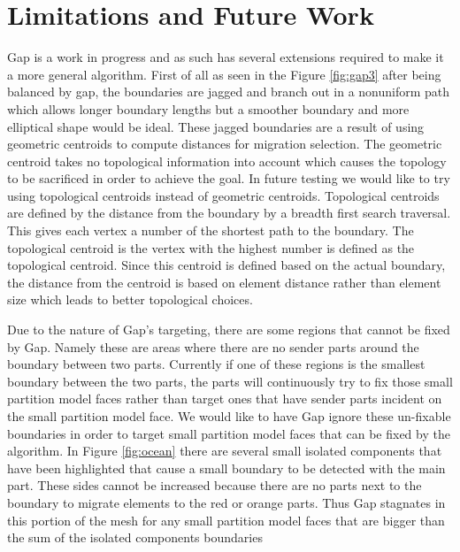 \documentclass{thesis}
\begin{document}
\chapter{Limitations and Future Work} 

Gap is a work in progress and as such has several extensions required to make 
it a more general algorithm. First of all as seen in the Figure \ref{fig:gap3} 
after being balanced by gap, the boundaries are jagged and branch out in a 
nonuniform path which allows longer boundary lengths but a smoother boundary 
and more elliptical shape would be ideal.  These jagged boundaries are a 
result of using geometric centroids to compute distances for migration 
selection. The geometric centroid takes no topological information into account 
which causes the topology to be sacrificed in order to achieve the goal. In 
future testing we would like to try using topological centroids instead of 
geometric centroids. Topological centroids are defined by the distance from the 
boundary by a breadth first search traversal. This gives each vertex a number 
of the shortest path to the boundary. The topological centroid is the vertex 
with the highest number is defined as the topological centroid. Since this 
centroid is defined based on the actual boundary, the distance from the 
centroid is based on element distance rather than element size which leads to 
better topological choices.

Due to the nature of Gap's targeting, there are some regions that cannot be 
fixed by Gap. Namely these are areas where there are no sender parts around 
the boundary between two parts. Currently if one of these regions is the 
smallest boundary between the two parts, the parts will continuously try to fix 
those small partition model faces rather than target ones that have sender 
parts incident on the small partition model face. We would like to have Gap 
ignore these un-fixable boundaries in order to target small partition model 
faces that can be fixed by the algorithm. In Figure \ref{fig:ocean} there are 
several small isolated components that have been highlighted that cause a 
small boundary to be detected with the main part. These sides cannot be 
increased because there are no parts next to the boundary to migrate elements 
to the red or orange parts. Thus Gap stagnates in this portion of the mesh 
for any small partition model faces that are bigger than the sum of the 
isolated components boundaries 
\end{document}
